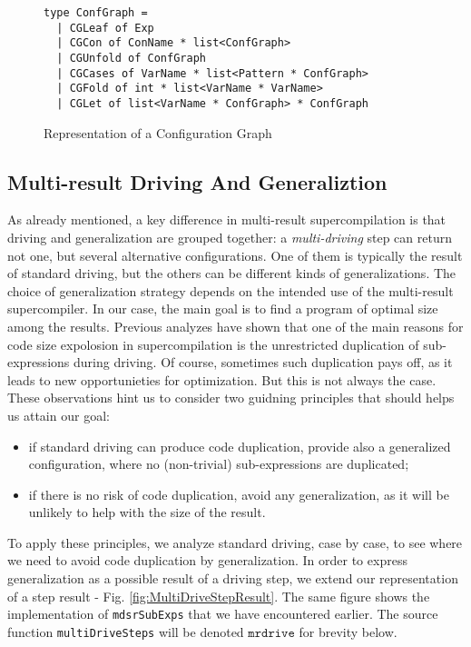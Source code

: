\documentclass[submission,copyright,creativecommons]{eptcs}
\begin{document}
\begin{figure}
\begin{lstlisting}
type ConfGraph =
  | CGLeaf of Exp
  | CGCon of ConName * list<ConfGraph>
  | CGUnfold of ConfGraph
  | CGCases of VarName * list<Pattern * ConfGraph>
  | CGFold of int * list<VarName * VarName>
  | CGLet of list<VarName * ConfGraph> * ConfGraph
\end{lstlisting}
\caption{Representation of a Configuration Graph}
\label{fig:ConfGraph}
\end{figure}

\subsection{Multi-result Driving And Generaliztion}

As already mentioned, a key difference in multi-result supercompilation is
that driving and generalization are grouped together: a \emph{multi-driving}
step can return not one, but several alternative configurations.
One of them is typically the result of standard driving, but the others
can be different kinds of generalizations.
The choice of generalization strategy depends on the intended use of the
multi-result supercompiler.
In our case, the main goal is to find a program of optimal size among the results.
Previous analyzes have shown that one of the main reasons for code size expolosion in
supercompilation is the unrestricted duplication of sub-expressions during driving.
Of course, sometimes such duplication pays off, as it leads to new opportunieties 
for optimization.
But this is not always the case.
These observations hint us to consider two guidning principles that should helps us attain our goal:
\begin{itemize}
  \item if standard driving can produce code duplication, provide also a generalized
    configuration, where no (non-trivial) sub-expressions are duplicated;
  \item if there is no risk of code duplication, avoid any generalization, as it will
    be unlikely to help with the size of the result.
\end{itemize}
To apply these principles, we analyze standard driving, case by case, to see where
we need to avoid code duplication by generalization.
In order to express generalization as a possible result of a driving step,
we extend our representation of a step result - Fig. \ref{fig:MultiDriveStepResult}.
The same figure shows the implementation of \verb|mdsrSubExps| that we have encountered earlier.
The source function \verb|multiDriveSteps| will be denoted $\mathtt{mrdrive}$ for brevity below.
\end{document}

